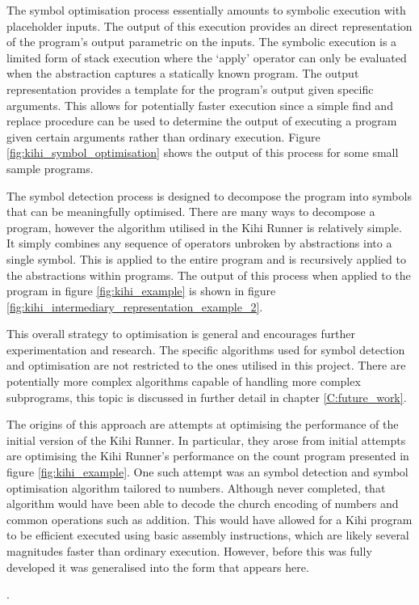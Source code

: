 The symbol optimisation process essentially amounts to symbolic execution with placeholder inputs. The output of this execution provides an direct representation of the program's output parametric on the inputs. The symbolic execution is a limited form of stack execution where the `apply' operator can only be evaluated when the abstraction captures a statically known program. The output representation provides a template for the program's output given specific arguments. This allows for potentially faster execution since a simple find and replace procedure can be used to determine the output of executing a program given certain arguments rather than ordinary execution. Figure \ref{fig:kihi_symbol_optimisation} shows the output of this process for some small sample programs. 



The symbol detection process is designed to decompose the program into symbols that can be meaningfully optimised. There are many ways to decompose a program, however the algorithm utilised in the Kihi Runner is relatively simple. It simply combines any sequence of operators unbroken by abstractions into a single symbol. This is applied to the entire program and is recursively applied to the abstractions within programs. The output of this process when applied to the program in figure \ref{fig:kihi_example} is shown in figure \ref{fig:kihi_intermediary_representation_example_2}.

This overall strategy to optimisation is general and encourages further experimentation and research. The specific algorithms used for symbol detection and optimisation are not restricted to the ones utilised in this project. There are potentially more complex algorithms capable of handling more complex subprograms, this topic is discussed in further detail in chapter \ref{C:future_work}.

The origins of this approach are attempts at optimising the performance of the initial version of the Kihi Runner. In particular, they arose from initial attempts are optimising the Kihi Runner's performance on the count program presented in figure \ref{fig:kihi_example}. One such attempt was an symbol detection and symbol optimisation algorithm tailored to numbers. Although never completed, that algorithm would have been able to decode the church encoding of numbers and common operations such as addition. This would have allowed for a Kihi program to be efficient executed using basic assembly instructions, which are likely several magnitudes faster than ordinary execution. However, before this was fully developed it was generalised into the form that appears here.

.

